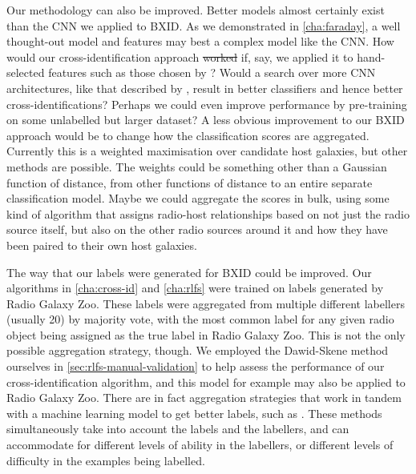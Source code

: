 \documentclass[11pt, a4paper]{book}
\providecommand{\DIFaddtex}[1]{{\protect\color{blue}\uwave{#1}}} %
\providecommand{\DIFdeltex}[1]{{\protect\color{red}\sout{#1}}}                      %
\providecommand{\DIFaddbegin}{} %
\providecommand{\DIFaddend}{} %
\providecommand{\DIFdelbegin}{} %
\providecommand{\DIFdelend}{} %
\providecommand{\DIFadd}[1]{\texorpdfstring{\DIFaddtex{#1}}{#1}} %
\providecommand{\DIFdel}[1]{\texorpdfstring{\DIFdeltex{#1}}{}} %
\newcommand{\DIFscaledelfig}{0.5}
\newlength{\DIFdelgraphicswidth} %
\newlength{\DIFdelgraphicsheight} %
\newcommand{\DIFaddincludegraphics}[2][]{{\color{blue}\fbox{\DIFOincludegraphics[#1]{#2}}}} %
\newcommand{\DIFdelincludegraphics}[2][]{%
\sbox{\DIFdelgraphicsbox}{\DIFOincludegraphics[#1]{#2}}%
\settoboxwidth{\DIFdelgraphicswidth}{\DIFdelgraphicsbox} %
\settoboxtotalheight{\DIFdelgraphicsheight}{\DIFdelgraphicsbox} %
\scalebox{\DIFscaledelfig}{%
\parbox[b]{\DIFdelgraphicswidth}{\usebox{\DIFdelgraphicsbox}\\[-\baselineskip] \rule{\DIFdelgraphicswidth}{0em}}\llap{\resizebox{\DIFdelgraphicswidth}{\DIFdelgraphicsheight}{%
\setlength{\unitlength}{\DIFdelgraphicswidth}%
\begin{picture}(1,1)%
\thicklines\linethickness{2pt} %
{\color[rgb]{1,0,0}\put(0,0){\framebox(1,1){}}}%
{\color[rgb]{1,0,0}\put(0,0){\line( 1,1){1}}}%
{\color[rgb]{1,0,0}\put(0,1){\line(1,-1){1}}}%
\end{picture}%
}\hspace*{3pt}}} %
} %
\DeclareRobustCommand{\DIFaddbegin}{\DIFOaddbegin \let\includegraphics\DIFaddincludegraphics} %
\DeclareRobustCommand{\DIFaddend}{\DIFOaddend \let\includegraphics\DIFOincludegraphics} %
\DeclareRobustCommand{\DIFdelbegin}{\DIFOdelbegin \let\includegraphics\DIFdelincludegraphics} %
\DeclareRobustCommand{\DIFdelend}{\DIFOaddend \let\includegraphics\DIFOincludegraphics} %
\begin{document}
    \DIFaddend Our methodology can also be improved. Better models almost certainly exist than the CNN we applied to BXID. As we demonstrated in \autoref{cha:faraday}, a well thought-out model and features may best a complex model like the CNN. How \DIFaddbegin \DIFadd{well }\DIFaddend would our cross-identification approach \DIFdelbegin \DIFdel{worked }\DIFdelend \DIFaddbegin \DIFadd{work }\DIFaddend if, say, we applied it to hand-selected features such as those chosen by \citet{proctor06}? Would a search over more CNN architectures, like that described by \citet{lukic_morphological_2019}, result in better classifiers and hence better cross-identifications? Perhaps we could even improve performance by pre-training on some unlabelled but larger dataset? A less obvious improvement to our BXID approach would be to change how the classification scores are aggregated. Currently this is a weighted maximisation over candidate host galaxies, but other methods are possible. The weights could be something other than a Gaussian function of distance, from other functions of distance to an entire separate classification model. Maybe we could aggregate the scores in bulk, using some kind of algorithm that assigns radio-host relationships based on not just the radio source itself, but also on the other radio sources around it and how they have been paired to their own host galaxies.

    The way that our labels were generated for BXID could be improved. Our algorithms in \autoref{cha:cross-id} and \autoref{cha:rlfs} were trained on labels generated by Radio Galaxy Zoo. These labels were aggregated from multiple different labellers (usually 20) by majority vote, with the most common label for any given radio object being assigned as the true label in Radio Galaxy Zoo. This is not the only possible aggregation strategy, though. We employed the Dawid-Skene method \citep{dawid79em} ourselves in \autoref{sec:rlfs-manual-validation} to help assess the performance of our cross-identification algorithm, and this model for example may also be applied to Radio Galaxy Zoo. There are in fact aggregation strategies that work in tandem with a machine learning model to get better labels, such as \citet{raykar_learning_2010}. These methods simultaneously take into account the labels and the labellers, and can accommodate for different levels of ability in the labellers, or different levels of difficulty in the examples being labelled.
\end{document}
